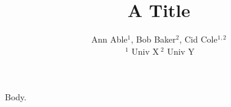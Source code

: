\documentclass{article}
\begin{document}
\title{A Title}
\author{Ann Able$^1$, Bob Baker$^2$, Cid Cole$^1$$^,$$^2$ \\
{\small $~^1$ Univ X}{\small $~^2$ Univ Y}}
\maketitle
Body.
\end{document}
